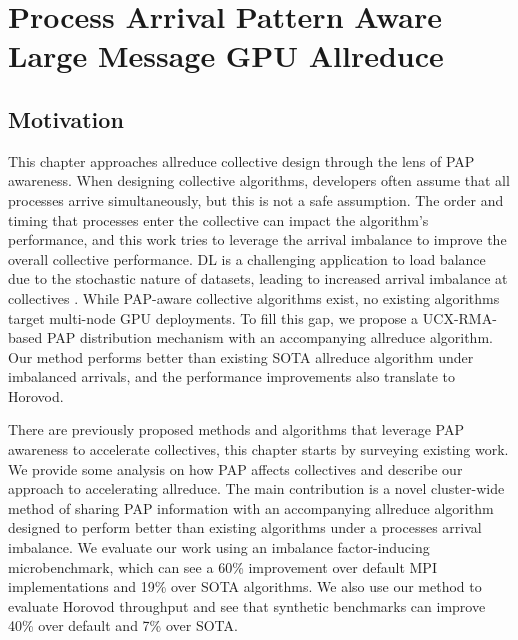 
\chapter[Process Arrival Pattern Aware Large Message GPU Allreduce]{Process Arrival Pattern Aware Large Message GPU Allreduce}\label{ch:CH5-PAPAwareness}

\section{Motivation}
This chapter approaches allreduce collective design through the lens of \gls{PAP} awareness.
When designing collective algorithms, developers often assume that all processes arrive simultaneously, but this is not a safe assumption.
The order and timing that processes enter the collective can impact the algorithm's performance, and this work tries to leverage the arrival imbalance to improve the overall collective performance.
\gls{DL} is a challenging application to load balance due to the stochastic nature of datasets, leading to increased arrival imbalance at collectives \cite{Mohammadalizadehbakhtevari2021Thesis, Alizadeh2022PAPCollDL, Li2020DLPartialColl}. 
While \gls{PAP}-aware collective algorithms exist, no existing algorithms target multi-node \gls{GPU} deployments. 
To fill this gap, we propose a \gls{UCX}-\gls{RMA}-based \gls{PAP} distribution mechanism with an accompanying allreduce algorithm.
Our method performs better than existing \gls{SOTA} allreduce algorithm under imbalanced arrivals, and the performance improvements also translate to Horovod.

There are previously proposed methods and algorithms that leverage \gls{PAP} awareness to accelerate collectives, this chapter starts by surveying existing work.
We provide some analysis on how \gls{PAP} affects collectives and describe our approach to accelerating allreduce.
The main contribution is a novel cluster-wide method of sharing \gls{PAP} information with an accompanying allreduce algorithm designed to perform better than existing algorithms under a processes arrival imbalance.
We evaluate our work using an imbalance factor-inducing microbenchmark, which can see a 60\% improvement over default \gls{MPI} implementations and 19\% over \gls{SOTA} algorithms.
We also use our method to evaluate Horovod throughput and see that synthetic benchmarks can improve 40\% over default and 7\% over \gls{SOTA}.

